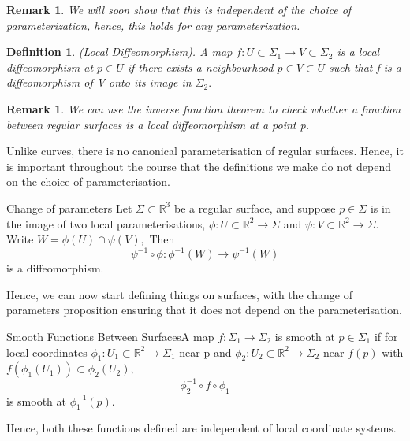 \documentclass[twoside]{article}
\newtheorem{definition}[theorem]{Definition}
\newtheorem{remark}[theorem]{Remark}
\begin{document}
\begin{remark}We will soon show that this is independent of the choice of parameterization, hence, this holds for any parameterization.
\end{remark}


\begin{definition}(Local Diffeomorphism). A map $f: U \subset \Sigma_1 \rightarrow V \subset \Sigma_2$ is a local diffeomorphism at $p \in U$ if there exists a neighbourhood $p \in V \subset U$ such that f is a diffeomorphism of V onto its image in $\Sigma_2.$
\end{definition}

\begin{remark}We can use the inverse function theorem to check whether a function between regular surfaces is a local diffeomorphism at a point p.
\end{remark}

Unlike curves, there is no canonical parameterisation of regular surfaces. Hence, it is important throughout the course that the definitions we make do not depend on the choice of parameterisation.

\begin{proposition_exam}{Change of parameters}{} Let $\Sigma \subset \mathbb{R}^3$ be a regular surface, and suppose $p \in \Sigma$ is in the image of two local parameterisations, $\phi: U \subset \mathbb{R}^2 \rightarrow \Sigma$ and $\psi: V \subset \mathbb{R}^2 \rightarrow \Sigma$. Write $W = \phi(U) \cap \psi(V),$ Then 
$$
\psi^{-1}\circ\phi: \phi^{-1}(W) \rightarrow \psi^{-1}(W)
$$
is a diffeomorphism.
\end{proposition_exam}

Hence, we can now start defining things on surfaces, with the change of parameters proposition ensuring that it does not depend on the parameterisation.

\begin{definition_exam}{Smooth Functions Between Surfaces}{}A map $f: \Sigma_1 \rightarrow \Sigma_2$ is smooth at $p \in \Sigma_1$ if for local coordinates $\phi_1: U_1 \subset \mathbb{R}^2 \rightarrow \Sigma_1$ near p and $\phi_2: U_2 \subset \mathbb{R}^2 \rightarrow \Sigma_2$ near $f(p)$ with $f(\phi_1(U_1)) \subset \phi_2(U_2)$, 
$$
\phi_2^{-1}\circ f \circ \phi_1
$$
is smooth at $\phi_1^{-1}(p).$
\end{definition_exam}

Hence, both these functions defined are independent of local coordinate systems.
\end{document}
